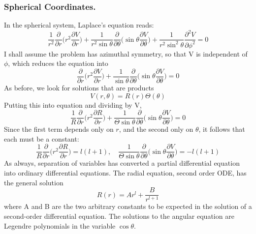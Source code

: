 \documentclass[../../../main.tex]{subfiles}
\begin{document}
\subsubsection*{Spherical Coordinates.} In the spherical system, Laplace's equation reads:
\begin{equation*}
    \frac{1}{r^2}\frac{\partial}{\partial r}\biggl(r^2\frac{\partial V}{\partial r}\biggr)+\frac{1}{r^2\sin\theta}\frac{\partial}{\partial \theta}\biggl(\sin\theta\frac{\partial V}{\partial \theta}\biggr)+\frac{1}{r^2\sin^2\theta}\frac{\partial^2 V}{\partial \phi^2}=0
\end{equation*}
I shall assume the problem has azimuthal symmetry, so that V is independent of $\phi$, which reduces the equation into
\begin{equation*}
    \frac{\partial}{\partial r}\biggl(r^2\frac{\partial V}{\partial r}\biggr)+\frac{1}{\sin\theta}\frac{\partial}{\partial \theta}\biggl(\sin\theta\frac{\partial V}{\partial \theta}\biggr)=0
\end{equation*}
As before, we look for solutions that are products
\begin{equation*}
    V (r, \theta) = R(r) \Theta(\theta)
\end{equation*}
Putting this into equation and dividing by V,
\begin{equation*}
    \frac{1}{R}\frac{\partial}{\partial r}\biggl(r^2\frac{\partial R}{\partial r}\biggr)+\frac{1}{\Theta\sin\theta}\frac{\partial}{\partial \theta}\biggl(\sin\theta\frac{\partial V}{\partial \theta}\biggr)=0
\end{equation*}
Since the first term depends only on $r$, and the second only on $\theta$, it follows that each must be a constant:
\begin{equation*}
    \frac{1}{R}\frac{\partial}{\partial r}\biggl(r^2\frac{\partial R}{\partial r}\biggr)=l(l+1),\quad \frac{1}{\Theta\sin\theta}\frac{\partial}{\partial \theta}\biggl(\sin\theta\frac{\partial V}{\partial \theta}\biggr)=-l(l+1)
\end{equation*}
As always, separation of variables has converted a partial differential equation into ordinary differential equations. The radial equation, second order ODE, has the general solution
\begin{equation*}
    R(r)=Ar^l+\frac{B}{r^{l+1}}
\end{equation*}
where A and B are the two arbitrary constants to be expected in the solution of a second-order differential equation. The solutions to the angular equation are Legendre polynomials in the variable $\cos \theta$.
\end{document}
